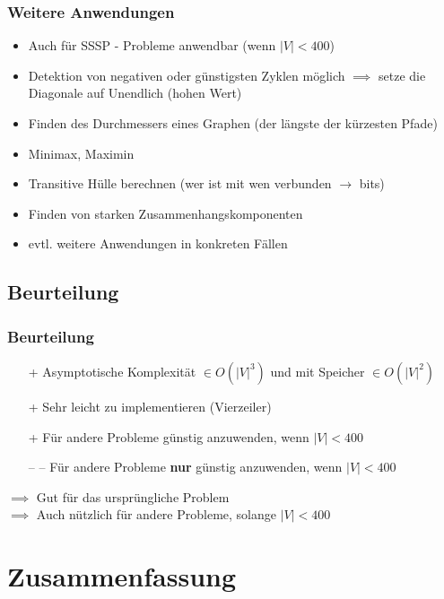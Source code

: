 \begin{frame}
\frametitle{Weitere Anwendungen}
\begin{itemize}

\item Auch für SSSP - Probleme anwendbar (wenn $\vert V \vert < 400$)
\item Detektion von negativen oder günstigsten Zyklen möglich $\implies$ setze die Diagonale auf Unendlich (hohen Wert)
\item Finden des Durchmessers eines Graphen (der längste der kürzesten Pfade)
\item Minimax, Maximin
\item Transitive Hülle berechnen (wer ist mit wen verbunden $\rightarrow$ bits)
\item Finden von starken Zusammenhangskomponenten
\item evtl. weitere Anwendungen in konkreten Fällen
\end{itemize}
\end{frame}


\subsection{Beurteilung} 

\begin{frame}
\frametitle{Beurteilung}
\begin{itemize}

\item[+] Asymptotische Komplexität $\in O(|V|^3)$  und mit Speicher $\in O(|V|^2)$
\item[+] Sehr leicht zu implementieren (Vierzeiler)
\item[+] Für andere Probleme günstig anzuwenden, wenn $|V|< 400$
\item[-- --] Für andere Probleme \textbf{nur} günstig anzuwenden, wenn $|V|< 400$
\end{itemize}

$\implies$ Gut für das ursprüngliche Problem\\
$\implies$ Auch nützlich für andere Probleme, solange $|V| < 400$
\end{frame}


\section{Zusammenfassung}

